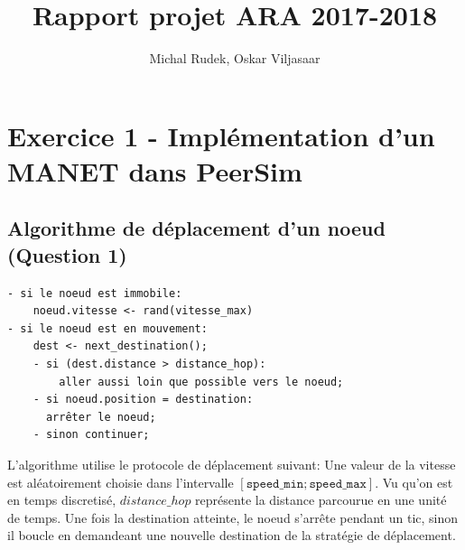 \documentclass[a4paper]{article}
\title{Rapport projet ARA 2017-2018}
\author{Michal Rudek, Oskar Viljasaar}
\begin{document}
\maketitle


\tableofcontents
\pagebreak
\section{Exercice 1 - Implémentation d'un MANET dans PeerSim}
\subsection{Algorithme de déplacement d'un noeud (Question 1)}

\begin{verbatim}
- si le noeud est immobile:
    noeud.vitesse <- rand(vitesse_max)
- si le noeud est en mouvement:
    dest <- next_destination();
    - si (dest.distance > distance_hop):
        aller aussi loin que possible vers le noeud;
    - si noeud.position = destination:
      arrêter le noeud;
    - sinon continuer;
\end{verbatim}
L'algorithme utilise le protocole de déplacement suivant:
Une valeur de la vitesse est aléatoirement choisie dans l'intervalle
$ \left[ \texttt{speed\_min}; \texttt{speed\_max} \right] $.
Vu qu'on est en temps discretisé, $distance\_hop$ représente la
distance parcourue en une unité de temps.
Une fois la destination atteinte, le noeud s'arrête pendant un tic,
 sinon il boucle en demandeant une nouvelle destination de la
 stratégie de déplacement.
\end{document}
